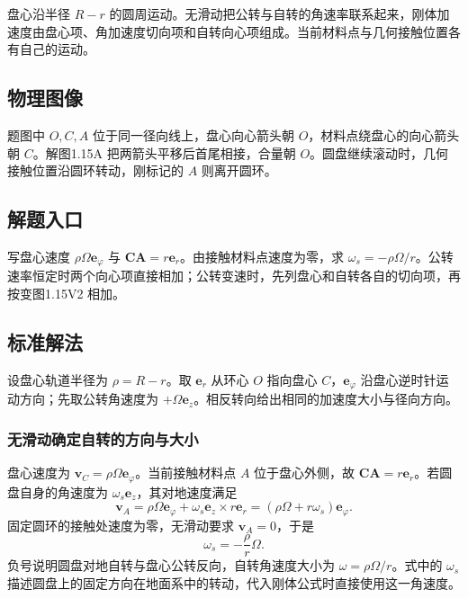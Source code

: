 \documentclass[UTF8,fontset=fandol,a4paper,11pt]{ctexart}
\newcommand{\vect}[1]{\bm{#1}}
\begin{document}
盘心沿半径 $R-r$ 的圆周运动。无滑动把公转与自转的角速率联系起来，刚体加速度由盘心项、角加速度切向项和自转向心项组成。当前材料点与几何接触位置各有自己的运动。




\subsection*{物理图像}

题图中 $O,C,A$ 位于同一径向线上，盘心向心箭头朝 $O$，材料点绕盘心的向心箭头朝 $C$。解图1.15A 把两箭头平移后首尾相接，合量朝 $O$。圆盘继续滚动时，几何接触位置沿圆环转动，刚标记的 $A$ 则离开圆环。



\subsection*{解题入口}

写盘心速度 $\rho\Omega\vect e_\varphi$ 与 $\vect{CA}=r\vect e_r$。由接触材料点速度为零，求 $\omega_s=-\rho\Omega/r$。公转速率恒定时两个向心项直接相加；公转变速时，先列盘心和自转各自的切向项，再按变图1.15V2 相加。



\subsection*{标准解法}

设盘心轨道半径为 $\rho=R-r$。取 $\vect e_r$ 从环心 $O$ 指向盘心 $C$，$\vect e_\varphi$ 沿盘心逆时针运动方向；先取公转角速度为 $+\Omega\vect e_z$。相反转向给出相同的加速度大小与径向方向。
\subsubsection*{无滑动确定自转的方向与大小}
盘心速度为 $\vect v_C=\rho\Omega\vect e_\varphi$。当前接触材料点 $A$ 位于盘心外侧，故 $\vect{CA}=r\vect e_r$。若圆盘自身的角速度为 $\omega_s\vect e_z$，其对地速度满足
\[
\vect v_A=\rho\Omega\vect e_\varphi
+\omega_s\vect e_z\times r\vect e_r
=(\rho\Omega+r\omega_s)\vect e_\varphi.
\]
固定圆环的接触处速度为零，无滑动要求 $\vect v_A=0$，于是
\[
\boxed{\omega_s=-\frac{\rho}{r}\Omega}.
\]
负号说明圆盘对地自转与盘心公转反向，自转角速度大小为 $\omega=\rho\Omega/r$。式中的 $\omega_s$ 描述圆盘上的固定方向在地面系中的转动，代入刚体公式时直接使用这一角速度。
\end{document}
